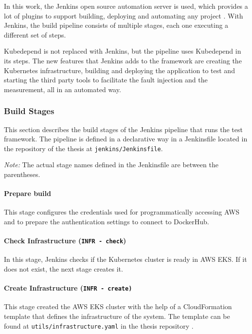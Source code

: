 In this work, the Jenkins open source automation server is used, which provides a lot of plugins to support building, deploying and automating any project \cite{Jenkins}. With Jenkins, the build pipeline consists of multiple stages, each one executing a different set of steps.
 
Kubedepend is not replaced with Jenkins, but the pipeline uses Kubedepend in its steps. The new features that Jenkins adds to the framework are creating the Kubernetes infrastructure, building and deploying the application to test and starting the third party tools to facilitate the fault injection and the measurement, all in an automated way.

\subsubsection{Build Stages}

This section describes the build stages of the Jenkins pipeline that runs the test framework. The pipeline is defined in a declarative way in a Jenkinsfile located in the repository of the thesis \cite{ThesisRepo} at \texttt{jenkins/Jenkinsfile}.

\emph{Note:} The actual stage names defined in the Jenkinsfile are between the parentheses.

\paragraph{Prepare build} This stage configures the credentials used for programmatically accessing AWS and to prepare the authentication settings to connect to DockerHub.

\paragraph{Check Infrastructure (\texttt{INFR - check})} In this stage, Jenkins checks if the Kubernetes cluster is ready in AWS EKS. If it does not exist, the next stage creates it.

\paragraph{Create Infrastructure (\texttt{INFR - create)}} This stage created the AWS EKS cluster with the help of a CloudFormation template that defines the infrastructure of the system. The template can be found at \texttt{utils/infrastructure.yaml} in the thesis repository \cite{ThesisRepo}.


